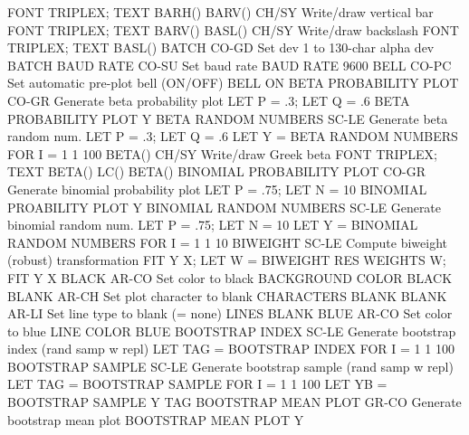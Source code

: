                                   FONT TRIPLEX; TEXT BARH()
BARV()                      CH/SY Write/draw vertical bar
                                  FONT TRIPLEX; TEXT BARV()
BASL()                      CH/SY Write/draw backslash
                                  FONT TRIPLEX; TEXT BASL()
BATCH                       CO-GD Set dev 1 to 130-char alpha dev
                                  BATCH
BAUD RATE                   CO-SU Set baud rate
                                  BAUD RATE 9600
BELL                        CO-PC Set automatic pre-plot bell (ON/OFF)
                                  BELL ON
BETA PROBABILITY PLOT       CO-GR Generate beta probability plot
                                  LET P = .3; LET Q = .6
                                  BETA PROBABILITY PLOT Y
BETA RANDOM NUMBERS         SC-LE Generate beta random num.
                                  LET P = .3; LET Q = .6
                                  LET Y = BETA RANDOM NUMBERS FOR I = 1 1 100
BETA()                      CH/SY Write/draw Greek beta
                                  FONT TRIPLEX; TEXT BETA() LC() BETA()
BINOMIAL PROBABILITY PLOT   CO-GR Generate binomial probability plot
                                  LET P = .75; LET N = 10
                                  BINOMIAL PROABILITY PLOT Y
BINOMIAL RANDOM NUMBERS     SC-LE Generate binomial random num.
                                  LET P = .75; LET N = 10
                                  LET Y = BINOMIAL RANDOM NUMBERS FOR I = 1 1 10
BIWEIGHT                    SC-LE Compute biweight (robust) transformation
                                  FIT Y X; LET W = BIWEIGHT RES
                                  WEIGHTS W; FIT Y X
BLACK                       AR-CO Set color to black
                                  BACKGROUND COLOR BLACK
BLANK                       AR-CH Set plot character to blank
                                  CHARACTERS BLANK
BLANK                       AR-LI Set line type to blank (= none)
                                  LINES BLANK
BLUE                        AR-CO Set color to blue
                                  LINE COLOR BLUE
BOOTSTRAP INDEX             SC-LE Generate bootstrap index (rand samp w repl)
                                  LET TAG = BOOTSTRAP INDEX FOR I = 1 1 100
BOOTSTRAP SAMPLE            SC-LE Generate bootstrap sample (rand samp w repl)
                                  LET TAG = BOOTSTRAP SAMPLE FOR I = 1 1 100
                                  LET YB = BOOTSTRAP SAMPLE Y TAG
BOOTSTRAP MEAN PLOT         GR-CO Generate bootstrap mean plot
                                  BOOTSTRAP MEAN PLOT Y
